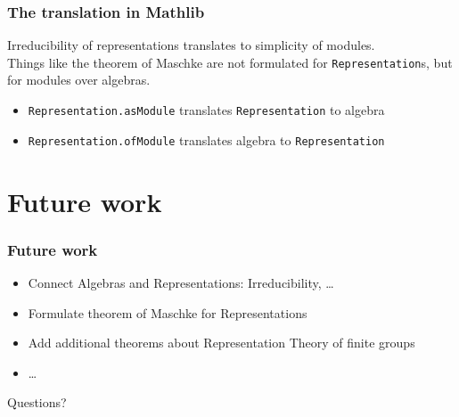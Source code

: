 \documentclass{beamer}
\begin{document}
\begin{frame}[fragile]
\frametitle{The translation in Mathlib}
Irreducibility of representations translates to simplicity of modules.\\
\pause
Things like the theorem of Maschke are not formulated for \verb+Representation+s, but for modules over algebras.\\
\pause
\vspace{1cm}
\begin{itemize}
\item \verb+Representation.asModule+ translates \verb+Representation+ to algebra
\item \verb+Representation.ofModule+ translates algebra to \verb+Representation+
\end{itemize}
\end{frame}


\section{Future work}
\begin{frame}
\frametitle{Future work}
\begin{itemize}
\pause
\item Connect Algebras and Representations: Irreducibility, \ldots
\pause
\item Formulate theorem of Maschke for Representations
\pause
\item Add additional theorems about Representation Theory of finite groups
\item \ldots
\end{itemize}
\end{frame}


\begin{frame}
\begin{center}
\huge Questions?
\end{center}
\end{frame}
\end{document}
